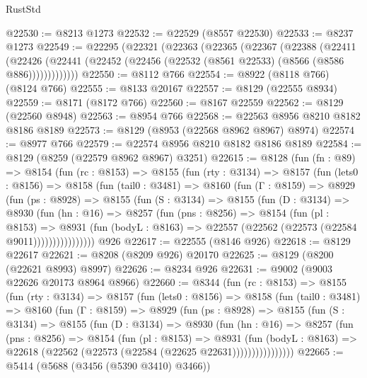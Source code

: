 \begin{lexlean}{RustStd}
\begin{coremodule}
@22530 := @8213 @1273
@22532 := @22529 (@8557 @22530)
@22533 := @8237 @1273
@22549 := @22295
    (@22321
      (@22363
        (@22365
          (@22367
            (@22388
              (@22411
                (@22426
                  (@22441 (@22452 (@22456 (@22532 (@8561 @22533) (@8566 (@8586 @886)))))))))))))
@22550 := @8112 @766
@22554 := @8922 (@8118 @766) (@8124 @766)
@22555 := @8133 @20167
@22557 := @8129 (@22555 @8934)
@22559 := @8171 (@8172 @766)
@22560 := @8167 @22559
@22562 := @8129 (@22560 @8948)
@22563 := @8954 @766
@22568 := @22563 @8956 @8210 @8182 @8186 @8189
@22573 := @8129 (@8953 (@22568 @8962 @8967) @8974)
@22574 := @8977 @766
@22579 := @22574 @8956 @8210 @8182 @8186 @8189
@22584 := @8129 (@8259 (@22579 @8962 @8967) @3251)
@22615 := @8128
    (fun (fn : @89) =>
    @8154
      (fun (rc : @8153) =>
      @8155
        (fun (rty : @3134) =>
        @8157
          (fun (lets0 : @8156) =>
          @8158
            (fun (tail0 : @3481) =>
            @8160
              (fun (Γ : @8159) =>
              @8929
                (fun (ps : @8928) =>
                @8155
                  (fun (S : @3134) =>
                  @8155
                    (fun (D : @3134) =>
                    @8930
                      (fun (hn : @16) =>
                      @8257
                        (fun (pns : @8256) =>
                        @8154
                          (fun (pl : @8153) =>
                          @8931
                            (fun (bodyL : @8163) =>
                            @22557 (@22562 (@22573 (@22584 @9011))))))))))))))))
    @926
@22617 := @22555 (@8146 @926)
@22618 := @8129 @22617
@22621 := @8208 (@8209 @926) @20170
@22625 := @8129 (@8200 (@22621 @8993) @8997)
@22626 := @8234 @926
@22631 := @9002 (@9003 @22626 @20173 @8964 @8966)
@22660 := @8344
    (fun (rc : @8153) =>
    @8155
      (fun (rty : @3134) =>
      @8157
        (fun (lets0 : @8156) =>
        @8158
          (fun (tail0 : @3481) =>
          @8160
            (fun (Γ : @8159) =>
            @8929
              (fun (ps : @8928) =>
              @8155
                (fun (S : @3134) =>
                @8155
                  (fun (D : @3134) =>
                  @8930
                    (fun (hn : @16) =>
                    @8257
                      (fun (pns : @8256) =>
                      @8154
                        (fun (pl : @8153) =>
                        @8931
                          (fun (bodyL : @8163) =>
                          @22618 (@22562 (@22573 (@22584 (@22625 @22631))))))))))))))))
@22665 := @5414 (@5688 (@3456 (@5390 @3410) @3466))

\end{coremodule}
\end{lexlean}
